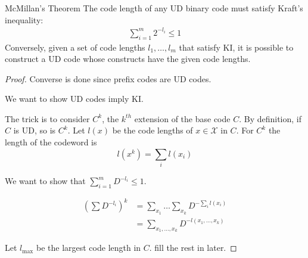 \begin{thrm}{McMillan's Theorem}{}
The code length of any UD binary code must satisfy Kraft's inequality:
\begin{align*}
    \sum_{i = 1}^m 2^{- l _{i} } \leq  1
\end{align*}
Conversely, given a set of  code lengths \(l_1, \dots , l_{m} \) that satisfy KI, it is possible to construct a UD code whose constructs have the given code lengths. 

\tcbline
\begin{proof}
Converse is done since prefix codes are UD codes.

We want to show UD codes imply KI. 

The trick is to consider \(C^k\), the \(k^{th} \) extension of the base code \(C\). By definition, if \(C\) is UD, so is \(C^k\). Let \(l(x)\) be the code lengths of \(x \in \mathcal{X} \) in \(C\). For \(C^k\) the length of the codeword is 
\[
    l(x^k) = \sum_{i} l(x_{i} )
\]

We want to show that \(\sum_{i = 1}^{m} D^{- l_{i}} \leq 1\). 

\begin{align*}
    \left( \sum D^{- l_{i} }\right) ^k &=  \sum_{x_1}\dots \sum_{x_{k} }  D^{- \sum_{i} l(x_{i} )}\\
    &= \sum_{x_1, \dots , x_{k} } D^{- l(x_1, \dots ,x_{k} )} 
\end{align*}


Let \(l_{\mathrm{max} } \) be the largest code length in \(C\). 
fill the rest in later.
\end{proof}


\end{thrm}